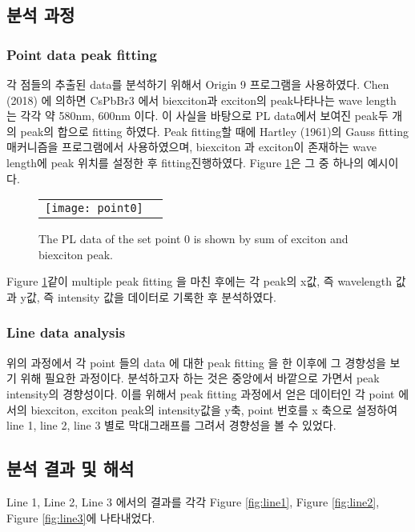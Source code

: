 \subsection{분석 과정}
\subsubsection{Point data peak fitting}
각 점들의 추출된 data를 분석하기 위해서 Origin 9 프로그램을 사용하였다. Chen (2018) 에 의하면 CsPbBr3 에서 biexciton과 exciton의 peak\이 나타나는 wave length 는 각각 약 580nm, 600nm 이다\cite{chen2018room}. 이 사실을 바탕으로 PL data에서 보여진 peak\을 두 개의 peak의 합으로 fitting 하였다. Peak fitting\을 할 때에 Hartley (1961)의 Gauss fitting 매커니즘을 프로그램에서 사용하였으며, biexciton 과 exciton이 존재하는 wave length에 peak 위치를 설정한 후 fitting\을 진행하였다\cite{hartley1961modified}. Figure \ref{fig:point0}은 그 중 하나의 예시이다.

\begin{figure}[H]
	\begin{center}
		\begin{tabular}{cc}
			\texttt{[image: point0]}
		\end{tabular}
	\end{center}
	\caption{The PL data of the set point 0 is shown by sum of exciton and biexciton peak.}
	\label{fig:point0}  
\end{figure}

Figure \ref{fig:point0}\과 같이 multiple peak fitting 을 마친 후에는 각 peak의 x값, 즉 wavelength 값과 y값, 즉 intensity 값을 데이터로 기록한 후 분석하였다.

\subsubsection{Line data analysis}
위의 과정에서 각 point 들의 data 에 대한 peak fitting 을 한 이후에 그 경향성을 보기 위해 필요한 과정이다. 분석하고자 하는 것은 중앙에서 바깥으로 가면서 peak intensity의 경향성이다. 이를 위해서 peak fitting 과정에서 얻은 데이터인 각 point 에서의 biexciton, exciton peak의 intensity값을 y축, point 번호를 x 축으로 설정하여  line 1, line 2, line 3 별로 막대그래프를 그려서 경향성을 볼 수 있었다.
\\

\subsection{분석 결과 및 해석}
Line 1, Line 2, Line 3 에서의 결과를 각각 Figure \ref{fig:line1}, Figure \ref{fig:line2}, Figure \ref{fig:line3}에 나타내었다.

